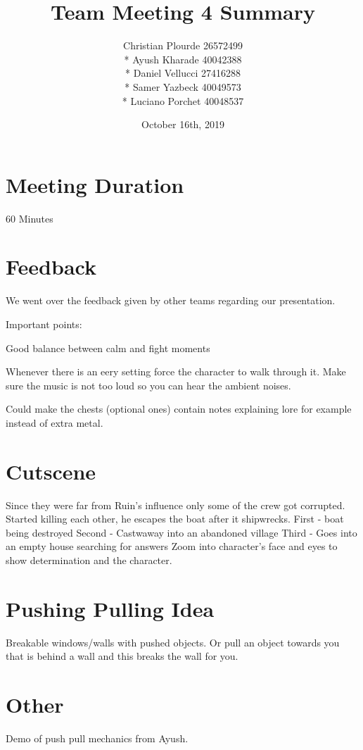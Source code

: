 \documentclass{article}
\begin{document}
\title{Team Meeting 4 Summary}
\author{Christian Plourde 26572499\\*
		Ayush Kharade 40042388\\*
		Daniel Vellucci 27416288\\*
		Samer Yazbeck 40049573\\*
		Luciano Porchet 40048537
		}
\date{October 16th, 2019}

\maketitle

\newpage

\section{Meeting Duration}
60 Minutes

\section{Feedback}
We went over the feedback given by other teams regarding our presentation.

Important points:
\begin{description}
\item Good balance between calm and fight moments
\item Whenever there is an eery setting force the character to walk through it. Make sure the music is not too loud so you can hear the ambient noises.
\item Could make the chests (optional ones) contain notes explaining lore for example instead of extra metal.
\end{description}

\section{Cutscene}
Since they were far from Ruin's influence only some of the crew got corrupted. Started killing each other, he escapes the boat after it shipwrecks. 
First - boat being destroyed
Second - Castwaway into an abandoned village
Third - Goes into an empty house searching for answers
Zoom into character's face and eyes to show determination and the character.

\section{Pushing Pulling Idea}
Breakable windows/walls with pushed objects. Or pull an object towards you that is behind a wall and this breaks the wall for you.

\section{Other}
Demo of push pull mechanics from Ayush.
\end{document}
